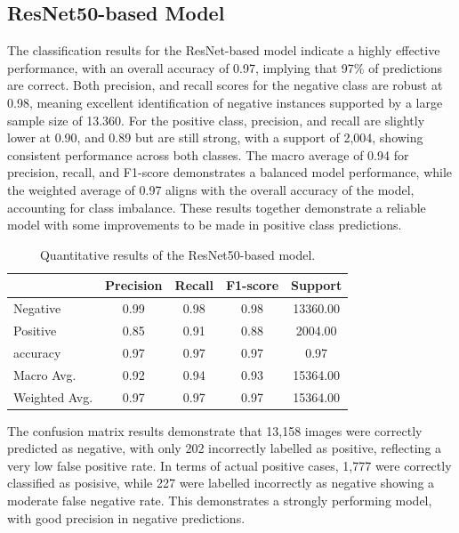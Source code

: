 \documentclass[../main]{subfiles}
\begin{document}
\subsection{ResNet50-based Model}
The classification results for the ResNet-based model indicate a highly effective performance, with an overall accuracy of 0.97, implying that 97\% of predictions are correct. Both precision, and recall scores for the negative class are robust at 0.98, meaning excellent identification of negative instances supported by a large sample size of 13.360. For the positive class, precision, and recall are slightly lower at 0.90, and 0.89 but are still strong, with a support of 2,004, showing consistent performance across both classes. The macro average of 0.94 for precision, recall, and F1-score demonstrates a balanced model performance, while the weighted average of 0.97 aligns with the overall accuracy of the model, accounting for class imbalance. These results together demonstrate a reliable model with some improvements to be made in positive class predictions.

\begin{table}[h!]
    \centering
    \begin{tabular}{|l|c|c|c|c|}
        \hline
         & Precision & Recall & F1-score & Support \\ \hline
        Negative & 0.99 & 0.98 & 0.98 & 13360.00 \\ \hline
        Positive & 0.85 & 0.91 & 0.88 & 2004.00 \\ \hline
        accuracy & 0.97 & 0.97 & 0.97 & 0.97 \\ \hline
        Macro Avg. & 0.92 & 0.94 & 0.93 & 15364.00 \\ \hline
        Weighted Avg. & 0.97 & 0.97 & 0.97 & 15364.00 \\ \hline
    \end{tabular}
    \caption{Quantitative results of the ResNet50-based model.}
    \label{tab:quantitative-results-resnet}
\end{table}

\noindent The confusion matrix results demonstrate that 13,158 images were correctly predicted as negative, with only 202 incorrectly labelled as positive, reflecting a very low false positive rate. In terms of actual positive cases, 1,777 were correctly classified as posisive, while 227 were labelled incorrectly as negative showing a moderate false negative rate. This demonstrates a strongly performing model, with good precision in negative predictions.
\end{document}
